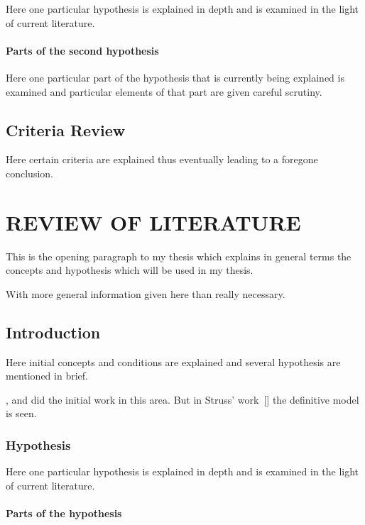 \documentclass[11pt]{isuthesis}
\begin{document}
Here one particular hypothesis is explained in depth
and is examined in the light of current literature.

\subsubsection{Parts of the second hypothesis}

Here one particular part of the hypothesis that is 
currently being explained is examined and particular
elements of that part are given careful scrutiny.

\section{Criteria Review}

Here certain criteria are explained thus eventually
leading to a foregone conclusion.

\chapter{REVIEW OF LITERATURE}

This is the opening paragraph to my thesis which
explains in general terms the concepts and hypothesis
which will be used in my thesis.

With more general information given here than really
necessary.

\section{Introduction}

Here initial concepts and conditions are explained and
several hypothesis are mentioned in brief.

\cite{allen}, \cite{bruner} and \cite{cox}
did the initial work in this area. But in Struss' work~[\cite{struss}]
the definitive model is seen.

\subsection{Hypothesis}

Here one particular hypothesis is explained in depth
and is examined in the light of current literature.

\subsubsection{Parts of the hypothesis}
\end{document}
